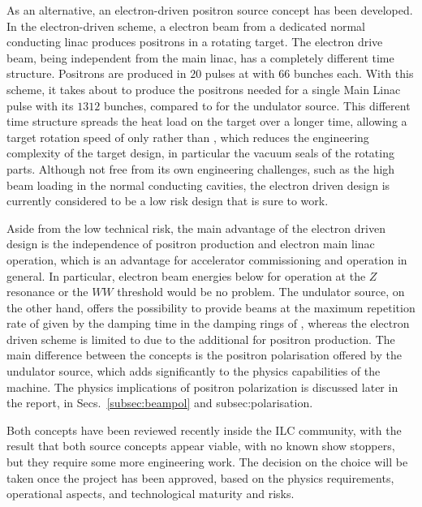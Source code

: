 As an alternative, an electron-driven positron source concept has been developed.
In the electron-driven scheme, a  electron beam from a dedicated normal conducting linac produces positrons in a rotating target.
The electron drive beam, being independent from the main linac, has a completely different time structure. 
Positrons are produced in $20$ pulses at  with $66$ bunches each.  With this scheme, it takes about  to produce the  positrons needed for a single Main Linac pulse with its $1312$ bunches, compared to  for the undulator source.
This different time structure spreads the heat load on the target over a longer time, allowing a target rotation speed of only  rather than , which reduces the engineering complexity of the target design, in particular the vacuum seals of the rotating parts.
Although not free from its own engineering challenges, such as the high beam loading in the normal conducting cavities, the electron driven design is currently considered to be a low risk design that is sure to work.

Aside from the low technical risk, the main advantage of the electron driven design is the independence of positron production and electron main linac operation, which is an advantage for accelerator commissioning and operation in general.
In particular, electron beam energies below  for operation at the $Z$ resonance or the $WW$ threshold would be no problem.
The undulator source, on the other hand, offers the possibility to provide beams at the maximum repetition rate of  given by the damping time in the damping rings of , whereas the electron driven scheme is limited to  due to the additional  for positron production.
The main difference between the concepts is the positron polarisation offered by the undulator source, which adds significantly to the physics capabilities of the machine.  The physics implications of positron polarization is discussed later in the report, in Secs.~\ref{subsec:beampol} and {subsec:polarisation}. 

Both concepts have been reviewed recently \cite{PWG:2018a} inside the ILC community, with the result that both source concepts appear viable, with no known show stoppers, but they
require some more engineering work. 
The decision on the choice will be taken once the project has been approved, based on the physics requirements, operational aspects, and technological maturity and risks. 

